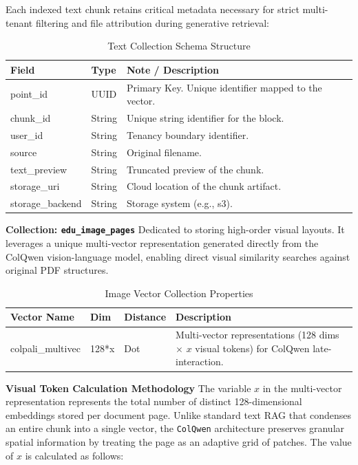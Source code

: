Each indexed text chunk retains critical metadata necessary for strict multi-tenant filtering and file attribution during generative retrieval:
\begin{table}[H]
    \centering
    \begin{tabular}{llp{8cm}}
        \toprule
        \textbf{Field} & \textbf{Type} & \textbf{Note / Description} \\
        \midrule
        point\_id & UUID & Primary Key. Unique identifier mapped to the vector. \\
        \midrule
        chunk\_id & String & Unique string identifier for the block. \\
        user\_id & String & Tenancy boundary identifier. \\
        source & String & Original filename. \\
        text\_preview & String & Truncated preview of the chunk. \\
        storage\_uri & String & Cloud location of the chunk artifact. \\
        storage\_backend & String & Storage system (e.g., s3). \\
        \bottomrule
    \end{tabular}
    \caption{Text Collection Schema Structure}
    \label{tab:qdrant_text_schema}
\end{table}

\textbf{Collection: \texttt{edu\_image\_pages}}
Dedicated to storing high-order visual layouts. It leverages a unique multi-vector representation generated directly from the ColQwen vision-language model, enabling direct visual similarity searches against original PDF structures.
\begin{table}[H]
    \centering
    \begin{tabular}{lp{1cm}p{1.8cm}p{5.5cm}}
        \toprule
        \textbf{Vector Name} & \textbf{Dim} & \textbf{Distance} & \textbf{Description} \\
        \midrule
        colpali\_multivec & 128*x & Dot & Multi-vector representations (128 dims $\times$ $x$ visual tokens) for ColQwen late-interaction. \\
        \bottomrule
    \end{tabular}
    \caption{Image Vector Collection Properties}
    \label{tab:qdrant_image}
\end{table}

\textbf{Visual Token Calculation Methodology}
The variable $x$ in the multi-vector representation represents the total number of distinct 128-dimensional embeddings stored per document page. Unlike standard text RAG that condenses an entire chunk into a single vector, the \texttt{ColQwen} architecture preserves granular spatial information by treating the page as an adaptive grid of patches. The value of $x$ is calculated as follows:

